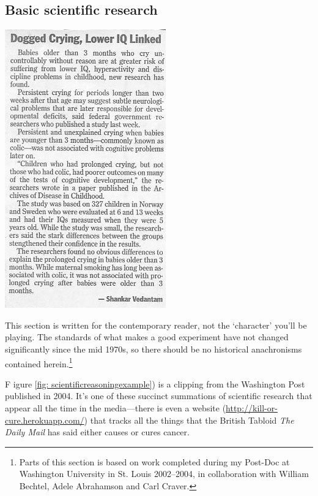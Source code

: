 \begin{refsection}
\subsection{Basic scientific research}
\label{basicscientificresearch}

\begin{marginfigure}
 \begin{center}


     \includegraphics[scale=0.50]{../images/scientificReasoning2.jpg}
\end{center}
 \caption{ ~\citep{Vedantam:2004tz}}
\label{fig: scientificreasoningexample}
\end{marginfigure}

This section is written for the contemporary reader, not the ‘character’ you’ll be playing. The standards of what makes a good experiment have not changed significantly since the mid 1970s, so there should be no historical anachronisms contained herein.\footnote{Parts of this section is based on work completed during my Post-Doc at Washington University in St. Louis 2002--2004, in collaboration with William Bechtel, Adele Abrahamson and Carl Craver.}

F igure \ref{fig: scientificreasoningexample}) is a clipping from the Washington Post published in 2004. It’s one of these succinct summations of scientific research that appear all the time in the media---there is even a website (\url{http://kill-or-cure.herokuapp.com/}) that tracks all the things that the British Tabloid \emph{The Daily Mail} has said either causes or cures cancer.


\end{refsection}
